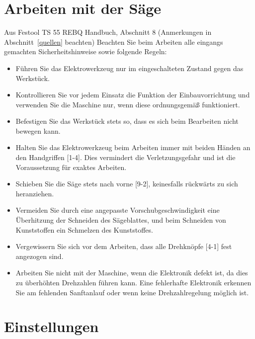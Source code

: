 \documentclass{\basedir/fablab-document}
\begin{document}
\section{Arbeiten mit der Säge}
\begin{leftbar}{Aus Festool TS 55 REBQ Handbuch, Abschnitt 8 (Anmerkungen in Abschnitt~\ref{quellen} beachten)}
Beachten Sie beim Arbeiten alle eingangs gemachten Sicherheitshinweise
sowie folgende Regeln:
\begin{itemize}
\item Führen Sie das Elektrowerkzeug nur im
eingeschalteten Zustand gegen das Werkstück.
\item Kontrollieren Sie vor jedem Einsatz die
Funktion der Einbauvorrichtung und verwenden Sie die Maschine nur, wenn diese
ordnungsgemäß funktioniert.
\item Befestigen Sie das Werkstück stets so,
dass es sich beim Bearbeiten nicht bewegen kann.
\item Halten Sie das Elektrowerkzeug beim Arbeiten immer mit beiden Händen an den
Handgriffen [1-4]. Dies vermindert die Verletzungsgefahr und ist die Voraussetzung
für exaktes Arbeiten.
\item Schieben Sie die Säge stets nach vorne [9-2], keinesfalls rückwärts zu sich heranziehen.
\item Vermeiden Sie durch eine angepasste Vorschubgeschwindigkeit eine Überhitzung
der Schneiden des Sägeblattes, und beim
Schneiden von Kunststoffen ein Schmelzen
des Kunststoffes.
\item Vergewissern Sie sich vor dem Arbeiten,
dass alle Drehknöpfe [4-1] fest angezogen
sind.
\item Arbeiten Sie nicht mit der Maschine, wenn
die Elektronik defekt ist, da dies zu überhöhten Drehzahlen führen kann. Eine fehlerhafte Elektronik erkennen Sie am fehlenden Sanftanlauf oder wenn keine Drehzahlregelung möglich ist.
\end{itemize}
\end{leftbar}

\section{Einstellungen}
\end{document}
